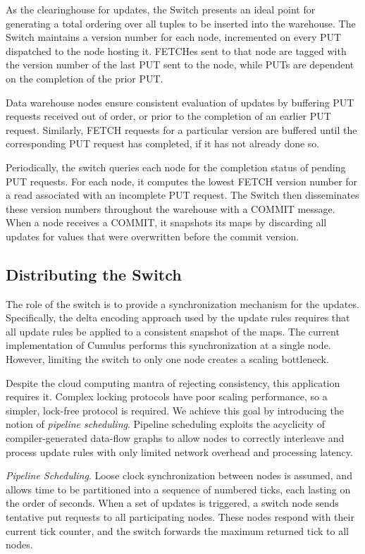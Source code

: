 As the clearinghouse for updates, the Switch presents an ideal point for generating a total ordering over all tuples to be inserted into the warehouse.  The Switch maintains a version number for each node, incremented on every PUT dispatched to the node hosting it.  FETCHes sent to that node are tagged with the version number of the last PUT sent to the node, while PUTs are dependent on the completion of the prior PUT.

Data warehouse nodes ensure consistent evaluation of updates by buffering PUT requests received out of order, or prior to the completion of an earlier PUT request.  Similarly, FETCH requests for a particular version are buffered until the corresponding PUT request has completed, if it has not already done so.

Periodically, the switch queries each node for the completion status of pending PUT requests.  For each node, it computes the lowest FETCH version number for a read associated with an incomplete PUT request.  The Switch then disseminates these version numbers throughout the warehouse with a COMMIT message.  When a node receives a COMMIT, it snapshots its maps by discarding all updates for values that were overwritten before the commit version.


\subsection{Distributing the Switch}
\label{sec:distswitch}


The role of the switch is to provide a synchronization mechanism for the updates.  Specifically, the delta encoding approach used by the update rules requires that all update rules be applied to a consistent snapshot of the maps.  The current implementation of Cumulus performs this synchronization at a single node.  However, limiting the switch to only one node creates a scaling bottleneck.  

Despite the cloud computing mantra of rejecting consistency, this application requires it.  Complex locking protocols have poor scaling performance, so a simpler, lock-free protocol is required.  We achieve this goal by introducing the notion of \textit{pipeline scheduling}.  Pipeline scheduling exploits the acyclicity of compiler-generated data-flow graphs to allow nodes to correctly interleave and process update rules with only limited network overhead and processing latency.


{\em Pipeline Scheduling}.
Loose clock synchronization between nodes is assumed, and allows time to be partitioned into a sequence of numbered ticks, each lasting on the order of seconds.  When a set of updates is triggered, a switch node sends tentative put requests to all participating nodes.  These nodes respond with their current tick counter, and the switch forwards the maximum returned tick to all nodes.

